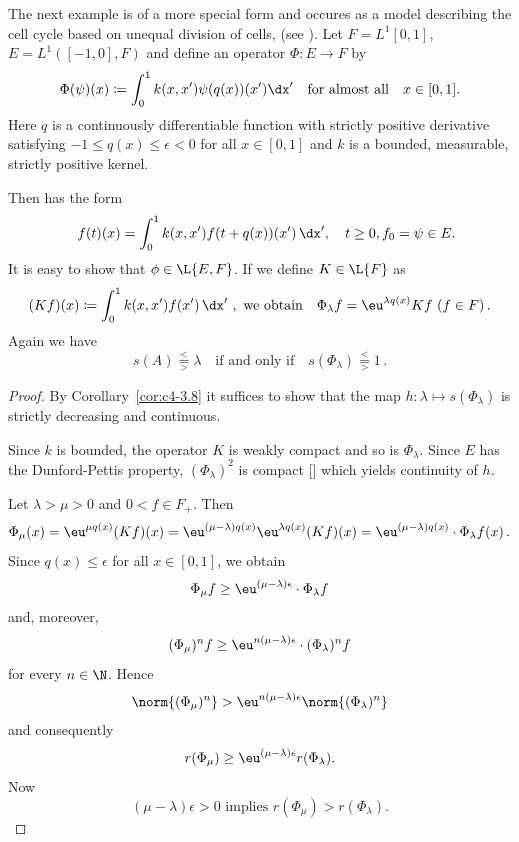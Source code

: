 \begin{example}\label{ex:c4-3.11}
The next example is of a more special form and occures as a model describing the cell cycle based on unequal division of cells, (see  \textcite{arinokimmel:1985}).
Let $F = L^{1}[0,1]$,\, $E = L^{1}([-1,0], F)$ and define an operator $\Phi \colon E \to F$ by
\[
\Phi(\psi)(x) \coloneqq \int_0^1 k(x,x')\psi(q(x))(x') \dx' \quad \text{for almost all} \quad x \in [0,1].
\]
Here $q$ is a continuously differentiable function with strictly positive derivative satisfying $-1 \leq q(x) \leq \epsilon < 0$ for all $x \in [0,1]$ and $k$ is a bounded, measurable, strictly positive kernel.

Then  has the form
\begin{equation} \label{eq:c4-3.12}
\quad f(t)(x) = \int_{0}^{1} k(x,x')f(t+q(x))(x') \, \dx', \quad t \geq 0, f_{0} = \psi \in E.
\end{equation}
It is easy to show that $\phi \in \L{E,F}$.
If we define $K \in \L{F}$  as 
\[
(Kf)(x) \coloneqq \int_{0}^{1} k(x,x')f(x') \, \dx' \ ,
\ \text{we obtain} \quad 
\Phi_{\lambda}f = \eu^{\lambda q(x)}Kf \,\, (f \in F)\,.
\]
Again we have 
\begin{equation*}\label{eq:c4-3.12-kgk1}
s(A) \overset{<}{ \underset{>}{=} }\lambda \quad \text{if and only if} \quad s(\Phi_{\lambda}) \overset{<}{ \underset{>}{=} } 1 \,.
\end{equation*}
\end{example}

\begin{proof}
By Corollary~\ref{cor:c4-3.8} it suffices to show that the map $h \colon \lambda \mapsto s(\Phi_{\lambda})$ is strictly decreasing and continuous.

Since $k$ is bounded, the operator $K$ is weakly compact and so is $\Phi_{\lambda}$.
Since $E$ has the Dunford-Pettis property, $(\Phi_{\lambda})^{2}$ is compact [\textcite[Theorem II.9.9]{schaefer:1974}] which yields continuity of\/ $h$.

Let $\lambda > \mu > 0$ and $0 < f \in F_{+}$.
Then 
\[
\Phi_{\mu}(x) = 
\eu^{\mu q(x)}(Kf)(x) = 
\eu^{(\mu-\lambda)q(x)}\eu^{\lambda q(x)}(Kf)(x) =
\eu^{(\mu-\lambda)q(x)} \cdot \Phi_{\lambda}f(x)\,.
\]
Since $q(x) \leq \epsilon$ for all $x \in [0,1]$, we obtain 
\[
\Phi_{\mu}f \geq \eu^{(\mu-\lambda)\epsilon} \cdot \Phi_{\lambda}f
\]
and, moreover, 
\[
(\Phi_{\mu})^n f \geq \eu^{n(\mu-\lambda)\epsilon} \cdot (\Phi_{\lambda})^n f
\]
for every $n \in \N$.
Hence 
\[
\norm{(\Phi_{\mu})^n} > \eu^{n(\mu-\lambda)\epsilon}\norm{(\Phi_{\lambda})^n}
\]
and consequently 
\[
r(\Phi_{\mu}) \geq \eu^{(\mu-\lambda)\epsilon}r(\Phi_{\lambda}) .
\]
Now 
\[
\text{$(\mu-\lambda)\epsilon > 0$ implies 
$r(\Phi_{\mu}) > r(\Phi_{\lambda})$.}
\]
\end{proof}


